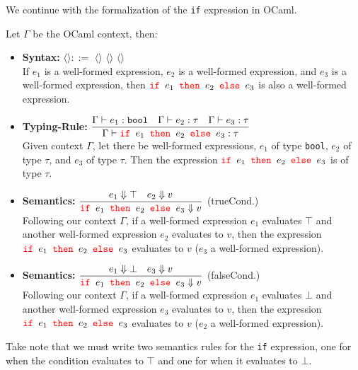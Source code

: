 \noindent
We continue with the formalization of the \texttt{if} expression in OCaml.
\begin{Def}
    
    Let $\Gamma$ be the OCaml context, then:
    \begin{itemize}
        \item \textbf{Syntax:} \LARGE $\langle$$\rangle::=$  $\langle$$\rangle$  $\langle$$\rangle$  $\langle$$\rangle$ \normalsize\\
     
        \vspace{-.5em}
        \noindent
        If $e_1$ is a well-formed expression, $e_2$ is a well-formed expression, and $e_3$ is a well-formed expression, then $\texttt{\color{red}{if }}e_1\texttt{\color{red}{ then }}e_2\texttt{\color{red}{ else }}e_3$ is also a well-formed expression.

        \item \textbf{Typing-Rule:} \LARGE $\dfrac{\Gamma\vdash e_1:\texttt{bool} \quad \Gamma\vdash e_2:\tau \quad \Gamma\vdash e_3:\tau}{\Gamma\vdash\texttt{\color{red}{if }}e_1\texttt{\color{red}{ then }}e_2\texttt{\color{red}{ else }}e_3:\tau}$ \normalsize\\

        \noindent
        Given context $\Gamma$, let there be well-formed expressions, $e_1$ of type \texttt{bool}, $e_2$ of type $\tau$, and $e_3$ of type $\tau$. Then the expression $\texttt{\color{red}{if }}e_1\texttt{\color{red}{ then }}e_2\texttt{\color{red}{ else }}e_3$ is of type $\tau$.

        \item \textbf{Semantics:} \LARGE $\dfrac{e_1\Downarrow \top \quad e_2\Downarrow v}{\texttt{\color{red}{if }}e_1\texttt{\color{red}{ then }}e_2\texttt{\color{red}{ else }}e_3\Downarrow v}$ (trueCond.) \normalsize\\
        
        \noindent
        Following our context $\Gamma$, if a well-formed expression $e_1$ evaluates $\top$ and another well-formed expression $e_2$ evaluates to $v$, then 
        the expression $\texttt{\color{red}{if }}e_1\texttt{\color{red}{ then }}e_2\texttt{\color{red}{ else }}e_3$ evaluates to $v$ ($e_3$ a well-formed expression).
        \item \textbf{Semantics:} \LARGE $\dfrac{e_1\Downarrow \bot \quad e_3\Downarrow v}{\texttt{\color{red}{if }}e_1\texttt{\color{red}{ then }}e_2\texttt{\color{red}{ else }}e_3\Downarrow v}$ (falseCond.) \normalsize\\
        
        \noindent
        Following our context $\Gamma$, if a well-formed expression $e_1$ evaluates $\bot$ and another well-formed expression $e_3$ evaluates to $v$, then
        the expression $\texttt{\color{red}{if }}e_1\texttt{\color{red}{ then }}e_2\texttt{\color{red}{ else }}e_3$ evaluates to $v$ ($e_2$ a well-formed expression).
    \end{itemize}

    \noindent
    Take note that we must write two semantics rules for the \texttt{if} expression, one for when the condition evaluates to $\top$ and one for when it evaluates to $\bot$.
\end{Def}

